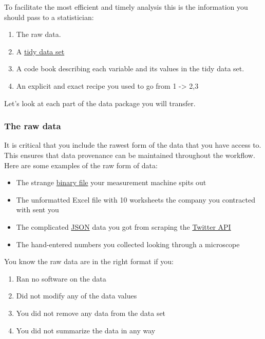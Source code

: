 \documentclass[
]{article}
\providecommand{\tightlist}{%
  \setlength{\itemsep}{0pt}\setlength{\parskip}{0pt}}
\begin{document}
To facilitate the most efficient and timely analysis this is the
information you should pass to a statistician:

\begin{enumerate}
\def\labelenumi{\arabic{enumi}.}
\tightlist
\item
  The raw data.
\item
  A \href{http://vita.had.co.nz/papers/tidy-data.pdf}{tidy data set}
\item
  A code book describing each variable and its values in the tidy data
  set.\\
\item
  An explicit and exact recipe you used to go from 1 -\textgreater{} 2,3
\end{enumerate}

Let's look at each part of the data package you will transfer.

\hypertarget{the-raw-data}{%
\subsubsection{The raw data}\label{the-raw-data}}

It is critical that you include the rawest form of the data that you
have access to. This ensures that data provenance can be maintained
throughout the workflow. Here are some examples of the raw form of data:

\begin{itemize}
\tightlist
\item
  The strange \href{http://en.wikipedia.org/wiki/Binary_file}{binary
  file} your measurement machine spits out
\item
  The unformatted Excel file with 10 worksheets the company you
  contracted with sent you
\item
  The complicated \href{http://en.wikipedia.org/wiki/JSON}{JSON} data
  you got from scraping the
  \href{https://twitter.com/twitterapi}{Twitter API}
\item
  The hand-entered numbers you collected looking through a microscope
\end{itemize}

You know the raw data are in the right format if you:

\begin{enumerate}
\def\labelenumi{\arabic{enumi}.}
\tightlist
\item
  Ran no software on the data
\item
  Did not modify any of the data values
\item
  You did not remove any data from the data set
\item
  You did not summarize the data in any way
\end{enumerate}
\end{document}
